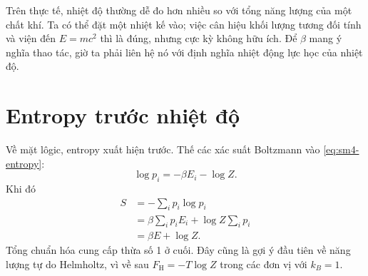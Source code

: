 \begin{classroomqa}
\end{classroomqa}

Trên thực tế, nhiệt độ thường dễ đo hơn nhiều so với tổng năng lượng của một chất khí. Ta có thể đặt một nhiệt kế vào; việc cân hiệu khối lượng tương đối tính và viện đến \(E=mc^2\) thì là đúng, nhưng cực kỳ không hữu ích. Để \(\beta\) mang ý nghĩa thao tác, giờ ta phải liên hệ nó với định nghĩa nhiệt động lực học của nhiệt độ.

\section{Entropy trước nhiệt độ}

Về mặt lôgic, entropy xuất hiện trước. Thế các xác suất Boltzmann vào
\eqref{eq:sm4-entropy}:
\begin{equation}
 \log p_i=-\beta E_i-\log Z.
\end{equation}
Khi đó
\begin{align}
 S
 &=-\sum_i p_i\log p_i\\
 &=\beta\sum_i p_iE_i+\log Z\sum_i p_i\\
 &=\beta E+\log Z.
 \label{eq:sm4-entropy-logz}
\end{align}
Tổng chuẩn hóa cung cấp thừa số 1 ở cuối. Đây cũng là gợi ý đầu tiên về năng lượng tự do Helmholtz, vì về sau
\(F_{\mathrm H}=-T\log Z\) trong các đơn vị với \(k_B=1\).

\begin{classroomqa}
\end{classroomqa}

\begin{classroomqa}
\end{classroomqa}


